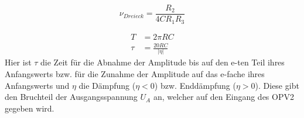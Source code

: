 \begin{equation*}
    \nu_{Dreieck} = \frac{R_2}{4 C R_1 R_3}
    \label{eq:Frequenz}
\end{equation*}


\begin{align}
    T &= 2 \pi R C \\ %
    \tau &= \frac{20 R C}{|\eta|} %
    \label{eq:SchwingAbkling}
\end{align}
Hier ist $\tau$ die Zeit für die Abnahme der Amplitude bis auf den e-ten Teil ihres Anfangswerts bzw. für die Zunahme der Amplitude auf das e-fache ihres Anfangswerts und $\eta$ die Dämpfung ($\eta < 0$) bzw. Enddämpfung ($\eta > 0$). Diese gibt den Bruchteil der Ausgangsspannung $U_A$ an, welcher auf den Eingang des OPV2 gegeben wird. %